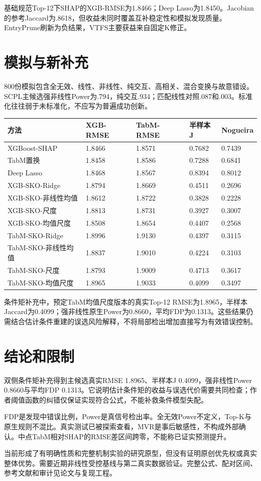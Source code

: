 \documentclass[UTF8,11pt,a4paper]{ctexart}
\begin{document}
基础规范Top-12下SHAP的XGB-RMSE为1.8466；Deep Lasso为1.8450。Jacobian的参考Jaccard为.8618，但收益未同时覆盖互补稳定性和模拟发现质量。EntryPrune刷新为负结果，VTFS主要获益来自固定K修正。

\newpage

\section{模拟与新补充}

800份模拟包含全无效、线性、非线性、纯交互、高相关、混合变换与故意错设。SCPL主候选强非线性Power为.794，纯交互.934；匹配线性对照.087和.003。标准化往往弱于未标准化，不应写为普遍成功创新。

{\def\LTcaptype{none} %
{
\footnotesize
\begin{longtable}[]{@{}lllll@{}}
\toprule\noalign{}
方法 & XGB-RMSE & TabM-RMSE & 半样本J & Nogueira \\
\midrule\noalign{}
\endhead
\bottomrule\noalign{}
\endlastfoot
XGBoost-SHAP & 1.8466 & 1.8571 & 0.7682 & 0.7439 \\
TabM置换 & 1.8458 & 1.8586 & 0.7288 & 0.6841 \\
Deep Lasso & 1.8468 & 1.8567 & 0.8394 & 0.8012 \\
XGB-SKO-Ridge & 1.8794 & 1.8669 & 0.4511 & 0.2696 \\
XGB-SKO-非线性均值 & 1.8612 & 1.8722 & 0.3828 & 0.2228 \\
XGB-SKO-尺度 & 1.8813 & 1.8731 & 0.3927 & 0.3007 \\
XGB-SKO-均值尺度 & 1.8508 & 1.8654 & 0.4407 & 0.2568 \\
TabM-SKO-Ridge & 1.8996 & 1.9130 & 0.4397 & 0.3115 \\
TabM-SKO-非线性均值 & 1.8837 & 1.9010 & 0.4224 & 0.3103 \\
TabM-SKO-尺度 & 1.8793 & 1.9009 & 0.4713 & 0.3617 \\
TabM-SKO-均值尺度 & 1.8965 & 1.9033 & 0.4099 & 0.3497 \\
\end{longtable}
}
}

条件矩补充中，预定TabM均值尺度版本的真实Top-12 RMSE为1.8965，半样本Jaccard为0.4099；强非线性原生Power为0.8660，平均FDP为0.1313。这些结果仍需结合估计条件重建的误选风险解释，不将局部检出增加直接写为有效错误控制。

\newpage

\section{结论和限制}

双侧条件矩补充得到主候选真实RMSE 1.8965、半样本J 0.4099，强非线性Power 0.8660与平均FDP 0.1313。它说明估计条件矩的收益与误选代价需要共同检查；作者阈值函数的纠错仅保证实现符合公式，不能补救条件模型失配。

FDP是发现中错误比例，Power是真信号检出率。全无效Power不定义，Top-K与原生规则不混比。真实测试已被探索查看，MVR是事后敏感性，不构成外部确认。中点TabM相对SHAP的RMSE差区间跨零，不能称已证实预测提升。

当前形成了有明确性质和完整机制实验的研究原型，但没有证明原创优先权或真实整体优势。需要近期非线性受控基线与第二真实数据验证。完整公式、配对区间、参考文献和审计见论文与复现工程。
\end{document}
